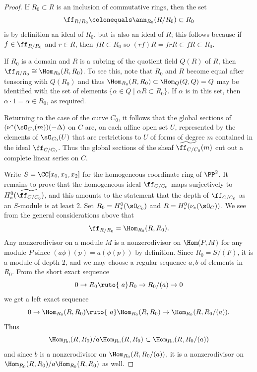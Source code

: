 \begin{proof}
If $R_{0}\subset R$ is an inclusion of commutative rings, then the set
$$\ff_{R/R_{0}} \colonequals  \ann_{R_{0}}(R/R_{0})\subset R_{0}$$ 
is by
definition an ideal of $R_{0}$, but is also an ideal of $R$; this follows
because if $f\in \ff_{R/R_{0}}$ and $r\in R$, then $fR\subset R_{0}$ so
 $(rf)R = frR \subset fR \subset R_{0}$.

If $R_{0}$ is a domain and $R$ is a subring of the quotient field $Q(R)$
of $R$, then
 $\ff_{R/R_{0}} \cong \Hom_{R_{0}}(R, R_{0})$. To see this, note that
 $R_{0}$ and $R$ become
 equal after tensoring with $Q(R_{0})$ and thus
 $\Hom_{R_{0}}(R,R_{0}) \subset \Hom_{Q}(Q,Q) = Q$
 may be identified
 with the set of elements $\{\alpha\in Q\mid \alpha R \subset R_{0}\}$. If
 $\alpha$ is in this set, then
  $\alpha\cdot 1 = \alpha \in R_{0}$, as required.

Returning to the case of the curve $C_{0}$, it follows that the global
sections of $(\nu^{*}(\sO_{C_{0}}(m))( -\Delta)$ on $C$
are, on each affine open set $U$, represented by the elements of
$\sO_{C_{0}}(U)$ that  are restrictions to $U$
of forms of degree $m$ contained in
the ideal $\ff_{C/C_{0}}$. Thus
the global sections of the sheaf $\widetilde{\ff_{C/C_{0}}}(m)$ cut out
a complete linear series on $C$.

Write $S =\CC[x_{0}, x_{1}, x_{2}]$ for the homogeneous coordinate ring
of $\PP^{2}$.
It remains to prove that the homogeneous ideal $\ff_{C/C_{0}}$ maps
surjectively to $H^{0}_{*}(\widetilde{\ff_{C/C_{0}}})$, and this amounts
to the
statement that the depth of $\ff_{C/C_{0}}$ as an $S$-module is 
at least 2.
Set $R_{0} = H^{0}_{*}(\sO_{C_{0}})$ and $R = H^{0}_{*}(\nu_{*} (\sO_{C}))$.
We see from the general considerations above that
$$
\ff_{R/R_{0}} = \Hom_{R_{0}}(R, R_{0}).
$$
Any nonzerodivisor on a module $M$
is a nonzerodivisor on $\Hom(P, M)$ for any module $P$ since $(a\phi)(p)
= a(\phi(p))$ by definition.
Since $R_{0} = S/(F)$, it is a module of depth 2, and we may choose a
regular sequence
$a,b$ of elements in~$R_{0}$. From the short exact sequence
$$
0\to R_{0}\ruto {\ a} R_{0}\to R_{0}/(a) \to 0
$$
we get a left exact sequence
$$
0\to \Hom_{R_{0}}(R,R_{0})\ruto {\ a} \Hom_{R_{0}}(R,R_{0})\to
\Hom_{R_{0}}(R,R_{0}/(a)).
$$
Thus
$$
\Hom_{R_{0}}(R,R_{0})/a\Hom_{R_{0}}(R,R_{0}) \subset
\Hom_{R_{0}}(R,R_{0}/(a))
$$
and since $b$ is a nonzerodivisor on $\Hom_{R_{0}}(R,R_{0}/(a))$, it is
a nonzerodivisor
on $\Hom_{R_{0}}(R,R_{0})/a\Hom_{R_{0}}(R,R_{0})$ as well.
\end{proof}

